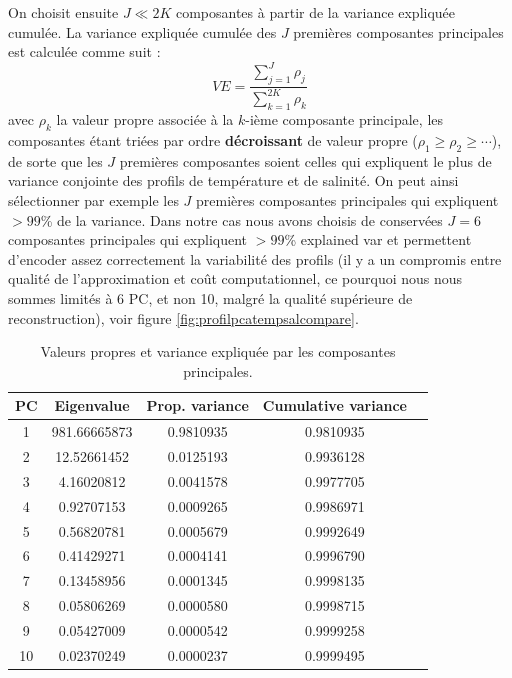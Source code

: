 \documentclass[11pt,a4paper,oneside]{report}
\begin{document}
	On choisit ensuite $J \ll 2K$ composantes à partir de la variance expliquée cumulée. La variance expliquée cumulée des $J$ premières composantes principales est calculée comme suit :
	\[
	VE = \frac{\sum_{j=1}^{J}\rho_j}{\sum_{k=1}^{2K} \rho_k}	
	\]
	avec $\rho_k$ la valeur propre associée à la $k$-ième composante principale, les composantes étant triées par ordre \textbf{décroissant} de valeur propre ($\rho_1 \geq \rho_2 \geq \cdots$), de sorte que les $J$ premières composantes soient celles qui expliquent le plus de variance conjointe des profils de température et de salinité. On peut ainsi sélectionner par exemple les $J$ premières composantes principales qui expliquent $>99$\% de la variance. Dans notre cas nous avons choisis de conservées $J=6$ composantes principales qui expliquent $>99$\% explained var et permettent d'encoder assez correctement la variabilité des profils (il y a un compromis entre qualité de l'approximation et coût computationnel, ce pourquoi nous nous sommes limités à 6 PC, et non 10, malgré la qualité supérieure de reconstruction), voir figure \ref{fig:profilpcatempsalcompare}.
	
	\begin{table}[H]
		\centering
		\begin{tabular}{ccccc}
			\toprule
			PC & Eigenvalue & Prop. variance & Cumulative variance \\
			\midrule
			1  & 981.66665873 & 0.9810935 & 0.9810935 \\
			2  & 12.52661452  & 0.0125193 & 0.9936128 \\
			3  & 4.16020812   & 0.0041578 & 0.9977705 \\
			4  & 0.92707153   & 0.0009265 & 0.9986971 \\
			5  & 0.56820781   & 0.0005679 & 0.9992649 \\
			6  & 0.41429271   & 0.0004141 & 0.9996790 \\
			7  & 0.13458956   & 0.0001345 & 0.9998135 \\
			8  & 0.05806269   & 0.0000580 & 0.9998715 \\
			9  & 0.05427009   & 0.0000542 & 0.9999258 \\
			10 & 0.02370249   & 0.0000237 & 0.9999495 \\
			\bottomrule
		\end{tabular}
		\caption{Valeurs propres et variance expliquée par les composantes principales.}
		\label{tab:pca_variance}
	\end{table}
	
	\vspace{1em}
	
\end{document}
